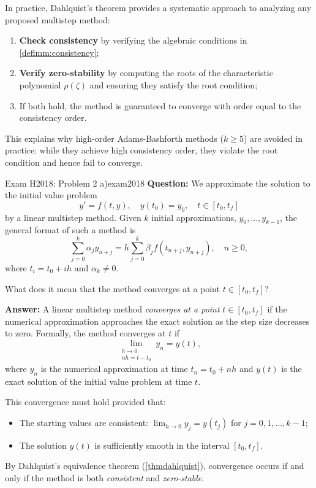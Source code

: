 In practice, Dahlquist's theorem provides a systematic approach to analyzing any proposed multistep method:

\begin{enumerate}
  \item \textbf{Check consistency} by verifying the algebraic conditions in \ref{deflmm:consistency};
  \item \textbf{Verify zero-stability} by computing the roots of the characteristic polynomial $\rho(\zeta)$ and ensuring they satisfy the root condition;
  \item If both hold, the method is guaranteed to converge with order equal to the consistency order.
\end{enumerate}

This explains why high-order Adams-Bashforth methods ($k \geq 5$) are avoided in practice: while they achieve high consistency order, they violate the root condition and hence fail to converge.

\begin{example}{Exam H2018: Problem 2 a)}{exam2018}
  \textbf{Question:} We approximate the solution to the initial value problem
  \[
    y' = f(t,y), \quad y(t_0) = y_0, \quad t \in [t_0, t_f]
  \]
  by a linear multistep method. Given $k$ initial approximations, $y_0, \ldots, y_{k-1}$, the general format of such a method is
  \[
    \sum_{j=0}^k \alpha_j y_{n+j} = h \sum_{j=0}^k \beta_j f(t_{n+j}, y_{n+j}), \quad n \geq 0,
  \]
  where $t_i = t_0 + ih$ and $\alpha_k \neq 0$.

  What does it mean that the method converges at a point $t \in [t_0, t_f]$?

  \textbf{Answer:} A linear multistep method \emph{converges at a point} $t \in [t_0, t_f]$ if the numerical approximation approaches the exact solution as the step size decreases to zero. Formally, the method converges at $t$ if
  \[
    \lim_{\substack{h \to 0 \\ nh = t - t_0}} y_n = y(t),
  \]
  where $y_n$ is the numerical approximation at time $t_n = t_0 + nh$ and $y(t)$ is the exact solution of the initial value problem at time $t$.

  This convergence must hold provided that:
  \begin{itemize}
    \item The starting values are consistent: $\lim_{h \to 0} y_j = y(t_j)$ for $j = 0, 1, \ldots, k-1$;
    \item The solution $y(t)$ is sufficiently smooth in the interval $[t_0, t_f]$.
  \end{itemize}

  By Dahlquist's equivalence theorem (\ref{thmdahlquist}), convergence occurs if and only if the method is both \emph{consistent} and \emph{zero-stable}.
\end{example}

